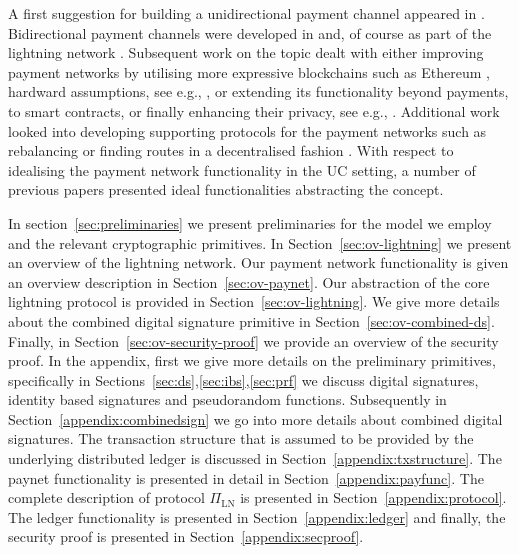  A first suggestion for building a unidirectional
payment channel appeared in \cite{spilman}. Bidirectional payment channels were
developed in \cite{DBLP:conf/sss/DeckerW15} and, of course as part of the
lightning network \cite{lightning}. Subsequent work on the topic dealt with
either improving payment networks by utilising more expressive blockchains such
as Ethereum \cite{perun}, hardward assumptions, see e.g.,
\cite{DBLP:conf/systor/LindNEKPS18}, or extending its functionality beyond
payments, to smart contracts, \cite{sprites} or finally enhancing their privacy,
see e.g.,
\cite{Malavolta:2017:CPP:3133956.3134096,DBLP:conf/ccs/0001M17,DBLP:conf/ndss/HeilmanABSG17}.
Additional work looked into developing supporting protocols for the payment
networks such as rebalancing \cite{DBLP:conf/ccs/KhalilG17} or finding routes in
a decentralised fashion \cite{flare,spider}. With respect to idealising the
payment network functionality in the UC setting, a number of previous papers
\cite{DBLP:conf/ccs/DziembowskiFH18,Malavolta:2017:CPP:3133956.3134096,sprites,perun}
presented ideal functionalities abstracting the concept.

 In section~\ref{sec:preliminaries} we present
preliminaries for the model we employ and the relevant cryptographic primitives.
In Section~\ref{sec:ov-lightning} we present an overview of the lightning
network. Our payment network functionality is given an overview description in
Section~\ref{sec:ov-paynet}. Our abstraction of the core lightning protocol is
provided in Section~\ref{sec:ov-lightning}. We give more details about the
combined digital signature primitive in Section~\ref{sec:ov-combined-ds}.
Finally, in Section~\ref{sec:ov-security-proof} we provide an overview of the
security proof. In the appendix, first we give more details on the preliminary
primitives, specifically in Sections~\ref{sec:ds},\ref{sec:ibs},\ref{sec:prf} we
discuss digital signatures, identity based signatures and pseudorandom
functions. Subsequently in Section~\ref{appendix:combinedsign} we go into more
details about combined digital signatures. The transaction structure that is
assumed to be provided by the underlying distributed ledger is discussed in
Section~\ref{appendix:txstructure}. The paynet functionality is presented in
detail in Section~\ref{appendix:payfunc}. The complete description of protocol
$\Pi_{\mathrm{LN}}$ is presented in Section~\ref{appendix:protocol}. The ledger
functionality is presented in Section~\ref{appendix:ledger} and finally, the
security proof is presented in Section~\ref{appendix:secproof}.
